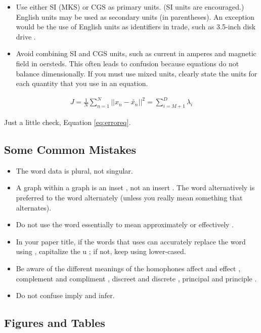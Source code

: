 \documentclass[letterpaper, 10 pt, conference]{ieeeconf} %
\begin{document}
\begin{itemize}

    \item Use either SI (MKS) or CGS as primary units. (SI units are encouraged.) English units may be used as secondary units (in parentheses). An exception would be the use of English units as identifiers in trade, such as 3.5-inch disk drive .
    \item Avoid combining SI and CGS units, such as current in amperes and magnetic field in oersteds. This often leads to confusion because equations do not balance dimensionally. If you must use mixed units, clearly state the units for each quantity that you use in an equation.

\end{itemize}

\begin{align}
    J = \frac{1}{N} \sum_{n=1}^{N} \lvert \lvert x_n - \widetilde{x_n} \rvert \rvert ^2 = \sum_{i = M+1}^{D} \lambda_i \label{eq:erroreq}
\end{align}

Just a little check, Equation \ref{eq:erroreq}.

\subsection{Some Common Mistakes}
\begin{itemize}

    \item The word data is plural, not singular.
    \item A graph within a graph is an inset , not an insert . The word alternatively is preferred to the word alternately (unless you really mean something that alternates).
    \item Do not use the word essentially to mean approximately or effectively .
    \item In your paper title, if the words that uses can accurately replace the word using , capitalize the u ; if not, keep using lower-cased.
    \item Be aware of the different meanings of the homophones affect and effect , complement and compliment , discreet and discrete , principal and principle .
    \item Do not confuse imply and infer.

\end{itemize}

\subsection{Figures and Tables}
\end{document}
